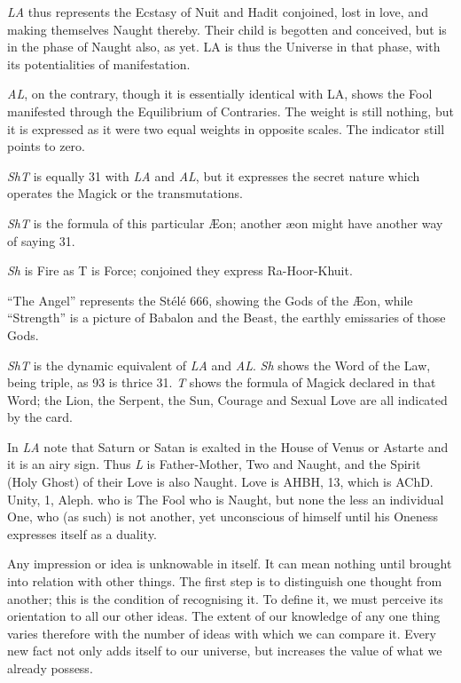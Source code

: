 \textit{LA} thus represents the Ecstasy of Nuit and Hadit conjoined, lost in love, and making themselves Naught thereby. Their child is begotten and conceived, but is in the phase of Naught also, as yet. LA is thus the Universe in that phase, with its potentialities of manifestation.

\textit{AL}, on the contrary, though it is essentially identical with LA, shows the Fool manifested through the Equilibrium of Contraries. The weight is still nothing, but it is expressed as it were two equal weights in opposite scales. The indicator still points to zero.

\textit{ShT} is equally 31 with \textit{LA} and \textit{AL}, but it expresses the secret nature which operates the Magick or the transmutations.

\textit{ShT} is the formula of this particular \AE{}on; another \ae{}on might have another way of saying 31.

\textit{Sh} is Fire as T is Force; conjoined they express Ra-Hoor-Khuit.

\enquote{The Angel} represents the St\'{e}l\'{e} 666, showing the Gods of the \AE{}on, while \enquote{Strength} is a picture of Babalon and the Beast, the earthly emissaries of those Gods.

\textit{ShT} is the dynamic equivalent of \textit{LA} and \textit{AL}. \textit{Sh} shows the Word of the Law, being triple, as 93 is thrice 31. \textit{T} shows the formula of Magick declared in that Word; the Lion, the Serpent, the Sun, Courage and Sexual Love are all indicated by the card.

In \textit{LA} note that Saturn or Satan is exalted in the House of Venus or Astarte and it is an airy sign. Thus \textit{L} is Father-Mother, Two and Naught, and the Spirit (Holy Ghost) of their Love is also Naught. Love is AHBH, 13, which is AChD. Unity, 1, Aleph. who is The Fool who is Naught, but none the less an individual One, who (as such) is not another, yet unconscious of himself until his Oneness expresses itself as a duality.

Any impression or idea is unknowable in itself. It can mean nothing until brought into relation with other things. The first step is to distinguish one thought from another; this is the condition of recognising it. To define it, we must perceive its orientation to all our other ideas. The extent of our knowledge of any one thing varies therefore with the number of ideas with which we can compare it. Every new fact not only adds itself to our universe, but increases the value of what we already possess.

